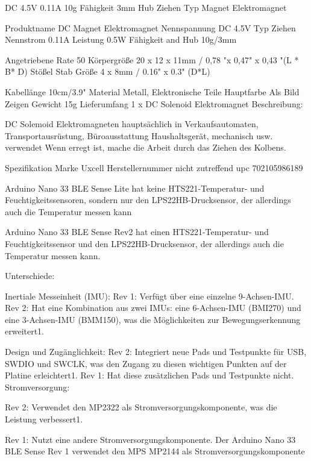DC 4.5V 0.11A 10g Fähigkeit 3mm Hub Ziehen Typ Magnet Elektromagnet


Produktname	DC Magnet Elektromagnet
Nennspannung	DC 4.5V
Typ	Ziehen
Nennstrom	0.11A
Leistung	0.5W
Fähigkeit and Hub	
10g/3mm

Angetriebene Rate	50%
Körpergröße	20 x 12 x 11mm / 0,78 "x 0,47" x 0,43 "(L * B* D)
Stößel Stab Größe	
4 x 8mm / 0.16" x 0.3" (D*L)

Kabellänge	10cm/3.9"
Material	Metall, Elektronische Teile
Hauptfarbe	Als Bild Zeigen
Gewicht	15g
Lieferumfang	1 x DC Solenoid Elektromagnet
Beschreibung:

DC Solemoid Elektromagneten hauptsächlich in Verkaufsautomaten, Transportausrüstung, Büroausstattung Haushaltsgerät, mechanisch usw. verwendet
Wenn erregt ist, mache die Arbeit durch das Ziehen des Kolbens.

Spezifikation
Marke	Uxcell
Herstellernummer	nicht zutreffend
upc	702105986189




Arduino Nano 33 BLE Sense Lite hat  keine HTS221-Temperatur- und Feuchtigkeitssensoren, sondern nur den LPS22HB-Drucksensor, der allerdings auch die Temperatur messen kann

Arduino Nano 33 BLE Sense Rev2 hat  einen HTS221-Temperatur- und Feuchtigkeitssensor und den LPS22HB-Drucksensor, der allerdings auch die Temperatur messen kann.


Unterschiede:

Inertiale Messeinheit (IMU):
Rev 1: Verfügt über eine einzelne 9-Achsen-IMU.
Rev 2: Hat eine Kombination aus zwei IMUs: eine 6-Achsen-IMU (BMI270) und eine 3-Achsen-IMU (BMM150), was die Möglichkeiten zur Bewegungserkennung erweitert1.

Design und Zugänglichkeit:
Rev 2: Integriert neue Pads und Testpunkte für USB, SWDIO und SWCLK, was den Zugang zu diesen wichtigen Punkten auf der Platine erleichtert1.
Rev 1: Hat diese zusätzlichen Pads und Testpunkte nicht.
Stromversorgung:

Rev 2: Verwendet den MP2322 als Stromversorgungskomponente, was die Leistung verbessert1.

Rev 1: Nutzt eine andere Stromversorgungskomponente.
Der Arduino Nano 33 BLE Sense Rev 1 verwendet den MPS MP2144 als Stromversorgungskomponente